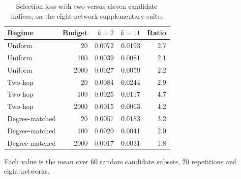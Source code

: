 \begin{table}[htbp]
\centering
\footnotesize
\caption{Selection loss with two versus eleven candidate indices, on the eight-network supplementary suite.}
\label{tab:ksize}
\begin{tabular}{l r r r r}
\toprule
Regime & Budget & $k=2$ & $k=11$ & Ratio \\
\midrule
Uniform & 20 & 0.0072 & 0.0193 & 2.7 \\
Uniform & 100 & 0.0039 & 0.0081 & 2.1 \\
Uniform & 2000 & 0.0027 & 0.0059 & 2.2 \\
Two-hop & 20 & 0.0084 & 0.0244 & 2.9 \\
Two-hop & 100 & 0.0025 & 0.0117 & 4.7 \\
Two-hop & 2000 & 0.0015 & 0.0063 & 4.2 \\
Degree-matched & 20 & 0.0057 & 0.0183 & 3.2 \\
Degree-matched & 100 & 0.0020 & 0.0041 & 2.0 \\
Degree-matched & 2000 & 0.0017 & 0.0031 & 1.8 \\
\bottomrule
\end{tabular}
\par\vspace{2pt}\begin{minipage}{\linewidth}\footnotesize Each value is the mean over 60 random candidate subsets, 20 repetitions and eight networks.\end{minipage}
\end{table}
